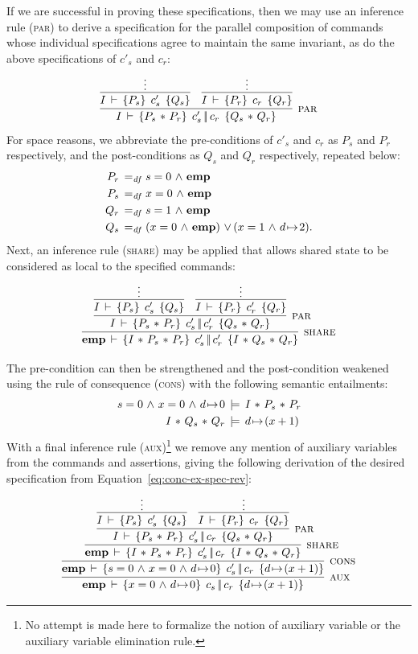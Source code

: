 \documentclass[11pt]{report}         %
\begin{document}
If we are successful in proving these specifications, then we may use an inference rule (\textsc{par}) to derive a specification for the parallel composition of commands whose individual specifications agree to maintain the same invariant, as do the above specifications of $c'_s$ and $c_r$: \[ \infer[\textsc{par}]{\spec{I}{P_s \fsep P_r}{c'_s \oppar c_r}{Q_s \fsep Q_r}}{ \infer{\spec{I}{P_s}{c'_s}{Q_s}}{\vdots} & \infer{\spec{I}{P_r}{c_r}{Q_r}}{\vdots} }\] For space reasons, we abbreviate the pre-conditions of $c'_s$ and $c_r$ as $P_s$ and $P_r$ respectively, and the post-conditions as $Q_s$ and $Q_r$ respectively, repeated below: \begin{align*}
  P_r \operatorname{\;=_{\mathit{df}}\;} & s = 0 \operatorname{\,\wedge\,} \mathbf{emp}\\
  P_s \operatorname{\;=_{\mathit{df}}\;} & x = 0 \operatorname{\,\wedge\,} \mathbf{emp}\\
  Q_r \operatorname{\;=_{\mathit{df}}\;} & s = 1 \operatorname{\,\wedge\,} \mathbf{emp}\\
  Q_s \operatorname{\;=_{\mathit{df}}\;} & (x = 0 \operatorname{\,\wedge\,} \mathbf{emp}) \operatorname{\,\vee\,} (x = 1 \operatorname{\,\wedge\,} d \!\mapsto\! 2).
\end{align*} Next, an inference rule (\textsc{share}) may be applied that allows shared state to be considered as local to the specified commands: \[ \infer[\textsc{share}]{ \spec{\femp}{I \fsep P_s \fsep P_r}{c'_s \oppar c'_r}{I \fsep Q_s \fsep Q_r} }{\infer[\textsc{par}]{\spec{I}{P_s \fsep P_r}{c'_s \oppar c'_r}{Q_s \fsep Q_r}}{ \infer{\spec{I}{P_s}{c'_s}{Q_s}}{\vdots} & \infer{\spec{I}{P_r}{c'_r}{Q_r}}{\vdots} }}\]

The pre-condition can then be strengthened and the post-condition weakened using the rule of consequence (\textsc{cons}) with the following semantic entailments: \begin{align*}
s = 0 \operatorname{\,\wedge\,} x = 0 \operatorname{\,\wedge\,} d \!\mapsto\! 0 & \,\models\, I \operatorname{\,\ast\,} P_s \operatorname{\,\ast\,} P_r \\ 
I \operatorname{\,\ast\,} Q_s \operatorname{\,\ast\,} Q_r & \,\models\, d \!\mapsto\! (x + 1)
\end{align*} With a final inference rule (\textsc{aux})\footnote{No attempt is made here to formalize the notion of auxiliary variable or the auxiliary variable elimination rule.} we remove any mention of auxiliary variables from the commands and assertions, giving the following derivation of the desired specification from Equation~\ref{eq:conc-ex-spec-rev}: 
\[ \infer[\textsc{aux}]{ \spec{\femp}{x = 0 \conj d \fpointsto 0}{c_s \oppar c_r}{d \fpointsto (x+1)} }{\infer[\textsc{cons}]{ \spec{\femp}{s = 0 \conj x = 0 \conj d \fpointsto 0}{c'_s \oppar c_r}{d \fpointsto (x+1)} }{\infer[\textsc{share}]{ \spec{\femp}{I \fsep P_s \fsep P_r}{c'_s \oppar c_r}{I \fsep Q_s \fsep Q_r} }{\infer[\textsc{par}]{\spec{I}{P_s \fsep P_r}{c'_s \oppar c_r}{Q_s \fsep Q_r}}{ \infer{\spec{I}{P_s}{c'_s}{Q_s}}{\vdots} & \infer{\spec{I}{P_r}{c_r}{Q_r}}{\vdots} }}}}\]
\end{document}
